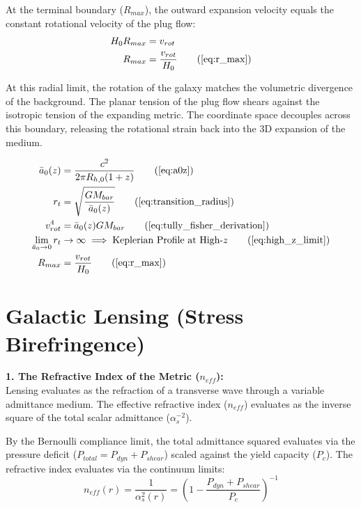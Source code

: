 At the terminal boundary ($R_{max}$), the outward expansion velocity equals the constant rotational velocity of the plug flow:
\begin{align}
    H_0 R_{max} &= v_{rot} \nonumber \\
    R_{max} &= \frac{v_{rot}}{H_0} \tag{\ref{eq:r_max}} 
\end{align}

At this radial limit, the rotation of the galaxy matches the volumetric divergence of the background. The planar tension of the plug flow shears against the isotropic tension of the expanding metric. The coordinate space decouples across this boundary, releasing the rotational strain back into the 3D expansion of the medium. 

\begin{tcolorbox}[recallbox, title={\ref{box:galactic_dynamics}. Galactic Kinematics \& The Continuum Shear Transition}]
\begin{align}
    \bar{a}_0(z) &= \frac{c^2}{2\pi R_{h,0}(1+z)} \tag{\ref{eq:a0z}} \\
    r_t &= \sqrt{\frac{G M_{bar}}{\bar{a}_0(z)}} \tag{\ref{eq:transition_radius}} \\
    v_{rot}^4 &= \bar{a}_0(z) G M_{bar} \tag{\ref{eq:tully_fisher_derivation}} \\
    \lim_{\bar{a}_0 \to 0} r_t &\to \infty \implies \text{Keplerian Profile at High-}z \tag{\ref{eq:high_z_limit}} \\
    R_{max} &= \frac{v_{rot}}{H_0} \tag{\ref{eq:r_max}} 
\end{align}
\end{tcolorbox}




\section{Galactic Lensing (Stress Birefringence)}
\label{sec:deriv_galactic_lensing}



\textbf{1. The Refractive Index of the Metric ($n_{eff}$):} \\
Lensing evaluates as the refraction of a transverse wave through a variable admittance medium. The effective refractive index ($n_{eff}$) evaluates as the inverse square of the total scalar admittance ($\alpha_s^{-2}$). %

By the Bernoulli compliance limit, the total admittance squared evaluates via the pressure deficit ($P_{total} = P_{dyn} + P_{shear}$) scaled against the yield capacity ($P_c$). The refractive index evaluates via the continuum limits: 
\begin{equation}
    n_{eff}(r) = \frac{1}{\alpha_s^2(r)} = \left( 1 - \frac{P_{dyn} + P_{shear}}{P_c} \right)^{-1} \label{eq:refractive_index_base} 
\end{equation}

